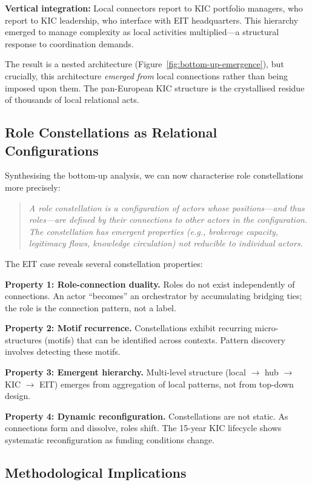 \textbf{Vertical integration:} Local connectors report to KIC portfolio managers, who report to KIC leadership, who interface with EIT headquarters. This hierarchy emerged to manage complexity as local activities multiplied---a structural response to coordination demands.

The result is a nested architecture (Figure~\ref{fig:bottom-up-emergence}), but crucially, this architecture \textit{emerged from} local connections rather than being imposed upon them. The pan-European KIC structure is the crystallised residue of thousands of local relational acts.

\subsection{Role Constellations as Relational Configurations}

Synthesising the bottom-up analysis, we can now characterise role constellations more precisely:

\begin{quote}
\textit{A role constellation is a configuration of actors whose positions---and thus roles---are defined by their connections to other actors in the configuration. The constellation has emergent properties (e.g., brokerage capacity, legitimacy flows, knowledge circulation) not reducible to individual actors.}
\end{quote}

The EIT case reveals several constellation properties:

\textbf{Property 1: Role-connection duality.} Roles do not exist independently of connections. An actor ``becomes'' an orchestrator by accumulating bridging ties; the role is the connection pattern, not a label.

\textbf{Property 2: Motif recurrence.} Constellations exhibit recurring micro-structures (motifs) that can be identified across contexts. Pattern discovery involves detecting these motifs.

\textbf{Property 3: Emergent hierarchy.} Multi-level structure (local $\rightarrow$ hub $\rightarrow$ KIC $\rightarrow$ EIT) emerges from aggregation of local patterns, not from top-down design.

\textbf{Property 4: Dynamic reconfiguration.} Constellations are not static. As connections form and dissolve, roles shift. The 15-year KIC lifecycle shows systematic reconfiguration as funding conditions change.

\subsection{Methodological Implications}

